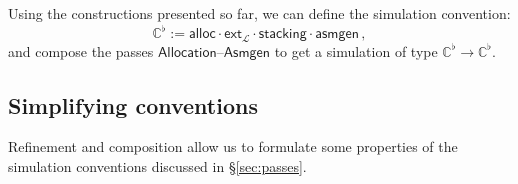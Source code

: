 \documentclass[sigplan,10pt,review,anonymous]{acmart}\settopmatter{printfolios=true,printccs=false,printacmref=false}
\newcommand{\kw}[1]{\ensuremath{ \mathsf{#1} }}
\begin{document}
Using the constructions presented so far,
we can define the simulation convention:
\[
    \mathbb{C}^\flat :=
      \kw{alloc} \cdot
      \kw{ext}_\mathcal{L} \cdot
      \kw{stacking} \cdot
      \kw{asmgen} \,,
\]
and compose the passes \kw{Allocation}--\kw{Asmgen}
to get a simulation of type
$\mathbb{C}^\flat \rightarrow \mathbb{C}^\flat$.

%
%
%


\subsection{Simplifying conventions} %

Refinement and composition allow us to formulate
some properties of the simulation conventions
discussed in \S\ref{sec:passes}.
\end{document}
